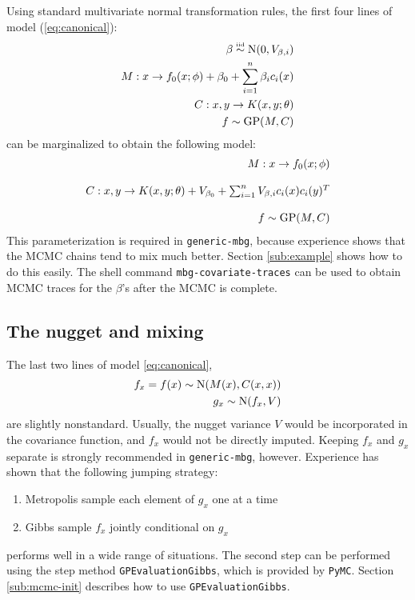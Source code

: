 Using standard multivariate normal transformation rules, the first four lines of model (\ref{eq:canonical}):
\begin{eqnarray*}
    \beta \stackrel{\textup{\tiny iid}}{\sim} \textup{N}(0,V_{\beta,i}) \\
    M:x\rightarrow f_0(x;\phi)+\beta_0 + \sum_{i=1}^n \beta_i c_i(x)\\
    C:x,y\rightarrow K(x,y;\theta)\\
    f \sim \textup{GP}(M,C)
\end{eqnarray*}
can be marginalized to obtain the following model:
\begin{equation}
    \label{eq:int-covariates} 
    \begin{array}{r}
    M:x\rightarrow f_0(x;\phi)\\\\
    C:x,y\rightarrow K(x,y;\theta) + V_{\beta_0} + \sum_{i=1}^n V_{\beta,i}c_i(x)c_i(y)^T\\\\
    f\sim\textup{GP}(M,C)
    \end{array}
\end{equation}
This parameterization is required in \texttt{generic-mbg}, because experience shows that the MCMC chains tend to mix much better. Section \ref{sub:example} shows how to do this easily. The shell command \texttt{mbg-covariate-traces} can be used to obtain MCMC traces for the $\beta$'s after the MCMC is complete.

\subsection{The nugget and mixing}

The last two lines of model \ref{eq:canonical},
\begin{eqnarray*}
    f_x = f(x) \sim \textup{N}(M(x), C(x,x))\\
    g_x \sim \textup{N}(f_x, V)
\end{eqnarray*}
are slightly nonstandard. Usually, the nugget variance $V$ would be incorporated in the covariance function, and $f_x$ would not be directly imputed. Keeping $f_x$ and $g_x$ separate is strongly recommended in \texttt{generic-mbg}, however. Experience has shown that the following jumping strategy:
\begin{enumerate}
    \item Metropolis sample each element of $g_x$ one at a time
    \item Gibbs sample $f_x$ jointly conditional on $g_x$
\end{enumerate}
performs well in a wide range of situations. The second step can be performed using the step method \texttt{GPEvaluationGibbs}, which is provided by \texttt{PyMC}. Section \ref{sub:mcmc-init} describes how to use \texttt{GPEvaluationGibbs}. 

